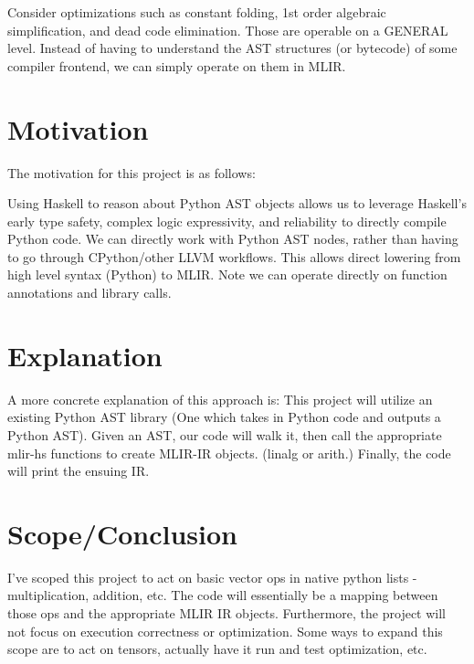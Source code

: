 \documentclass[11pt]{article}
\begin{document}
\noindent Consider optimizations such as constant folding, 1st order algebraic simplification, and
dead code elimination. Those are operable on a GENERAL level. Instead of having to
understand the AST structures (or bytecode) of some compiler frontend, we can simply operate on them in MLIR.

\section{Motivation}
The motivation for this project is as follows:

\noindent Using Haskell to reason about Python AST objects allows us to leverage
Haskell's early type safety, complex logic expressivity, and reliability to
directly compile Python code.
We can directly work with Python AST nodes, rather than having to go through
CPython/other LLVM workflows. This allows direct lowering from high level syntax (Python)
to MLIR. Note we can operate directly on
function annotations and library calls.

\section{Explanation}
A more concrete explanation of this approach is:
This project will utilize an existing Python AST library (One which takes in Python code and outputs a Python AST).
Given an AST, our code will walk it, then call the appropriate mlir-hs functions to
create MLIR-IR objects. (linalg or arith.) 
Finally, the code will print the ensuing IR.

\section{Scope/Conclusion}
I've scoped this project to act on basic vector ops in native python lists - multiplication, addition, etc.
The code will essentially be a mapping between those ops and the appropriate MLIR IR objects.
Furthermore, the project will not focus on execution correctness or optimization.
Some ways to expand this scope are to act on tensors, actually have it run and test optimization,
etc.
\end{document}
